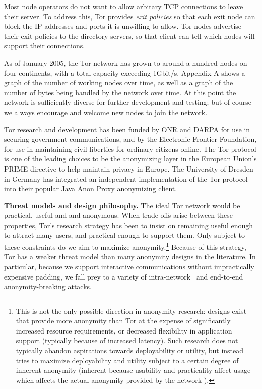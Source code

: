 \documentclass{llncs}
\begin{document}
Most node operators do not want to allow arbitary TCP connections to leave
their server.  To address this, Tor provides \emph{exit policies} so that
each exit node can block the IP addresses and ports it is unwilling to allow.
Tor nodes advertise their exit policies to the directory servers, so that
client can tell which nodes will support their connections.

As of January 2005, the Tor network has grown to around a hundred nodes
on four continents, with a total capacity exceeding 1Gbit/s. Appendix A
shows a graph of the number of working nodes over time, as well as a
graph of the number of bytes being handled by the network over time. At
this point the network is sufficiently diverse for further development
and testing; but of course we always encourage and welcome new nodes
to join the network.

Tor research and development has been funded by ONR and DARPA
for use in securing government
communications, and by the Electronic Frontier Foundation, for use
in maintaining civil liberties for ordinary citizens online. The Tor
protocol is one of the leading choices
to be the anonymizing layer in the European Union's PRIME directive to
help maintain privacy in Europe. The University of Dresden in Germany
has integrated an independent implementation of the Tor protocol into
their popular Java Anon Proxy anonymizing client.

\medskip
\noindent
{\bf Threat models and design philosophy.}
The ideal Tor network would be practical, useful and and anonymous. When
trade-offs arise between these properties, Tor's research strategy has been
to insist on remaining useful enough to attract many users,
and practical enough to support them.  Only subject to these
constraints do we aim to maximize
anonymity.\footnote{This is not the only possible
direction in anonymity research: designs exist that provide more anonymity
than Tor at the expense of significantly increased resource requirements, or
decreased flexibility in application support (typically because of increased
latency).  Such research does not typically abandon aspirations towards
deployability or utility, but instead tries to maximize deployability and
utility subject to a certain degree of inherent anonymity (inherent because
usability and practicality affect usage which affects the actual anonymity
provided by the network \cite{econymics,back01}).}
Because of this strategy, Tor has a weaker threat model than many anonymity
designs in the literature.   In particular, because we
support interactive communications without impractically expensive padding,
we fall prey to a variety
of intra-network~\cite{back01,attack-tor-oak05,flow-correlation04} and
end-to-end~\cite{danezis-pet2004,SS03} anonymity-breaking attacks.
\end{document}
